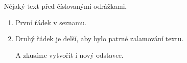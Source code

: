 Nějaký text před číslovanými odrážkami.
\begin{enumerate}
   \item První řádek v seznamu.
   \item Druhý řádek je delší, aby bylo
     patrné zalamování textu.

      A zkusíme vytvořit i nový odstavec.
\end{enumerate}